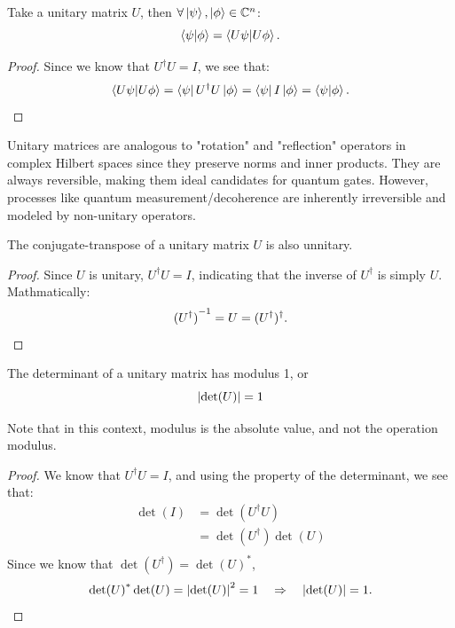 \documentclass[12pt]{article}
\begin{document}
\begin{theorem}
    Take a unitary matrix $U$, then $\forall \ket{\psi}, \ket{\phi} \in \mathbb{C}^n$:
    \[
    \braket{\psi}{\phi} = \braket{U \psi}{U \phi}.
    \]
\end{theorem}

\begin{proof}
    Since we know that $U^\dagger U = I$, we see that:
    \[
    \braket{U \psi}{U \phi} = \bra{\psi} U^\dagger U \ket{\phi} = \bra{\psi} I \ket{\phi} = \braket{\psi}{\phi}.
    \]
\end{proof}

Unitary matrices are analogous to "rotation" and "reflection" operators in complex Hilbert spaces since they preserve norms and inner products. They are always reversible, making them ideal candidates for quantum gates. However, processes like quantum measurement/decoherence are inherently irreversible and modeled by non-unitary operators.

\begin{theorem}
    The conjugate-transpose of a unitary matrix $U$ is also unnitary. 
\end{theorem}

\begin{proof}
    Since $U$ is unitary, $U^\dagger U = I$, indicating that the inverse of $U^\dagger$ is simply $U$. Mathmatically:
    \[
    {(U^\dagger)}^{-1} = U = (U^\dagger)^\dagger.
    \]
\end{proof}

\begin{theorem}
    The determinant of a unitary matrix has modulus 1, or
    \[
    \abs{\det(U)} = 1
    \]
\end{theorem}

Note that in this context, modulus is the absolute value, and not the operation modulus.

\begin{proof}
    We know that $U^\dagger U = I$, and using the property of the determinant, we see that:
    \begin{align*}
       \det(I) &= \det(U^\dagger U) \\
       &= \det(U^\dagger) \det(U) \\
    \end{align*}
    Since we know that \(\det(U^\dagger) = \det(U)^*\), 
    \[
    \det(U)^* \det(U) = \abs{\det(U)}^2 = 1 \quad \Rightarrow \quad \abs{\det(U)} = 1.
    \]
\end{proof}
\end{document}
